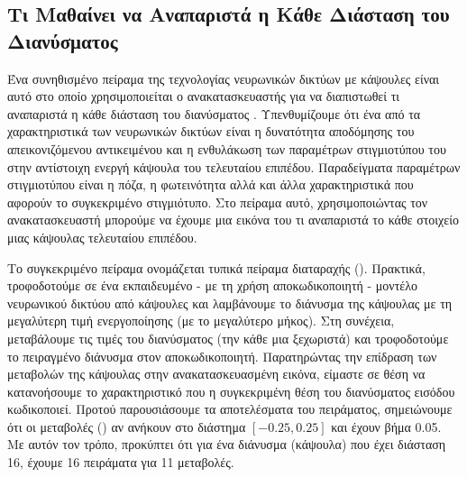 \subsection{Τι Μαθαίνει να Αναπαριστά η Κάθε Διάσταση του Διανύσματος }
Ένα συνηθισμένο πείραμα της τεχνολογίας νευρωνικών δικτύων με κάψουλες είναι αυτό στο οποίο χρησιμοποιείται ο ανακατασκευαστής για να διαπιστωθεί τι αναπαριστά η κάθε διάσταση του διανύσματος . Υπενθυμίζουμε ότι ένα από τα χαρακτηριστικά των νευρωνικών δικτύων είναι η δυνατότητα αποδόμησης του απεικονιζόμενου αντικειμένου και η ενθυλάκωση των παραμέτρων στιγμιοτύπου του στην αντίστοιχη ενεργή κάψουλα του τελευταίου επιπέδου. Παραδείγματα παραμέτρων στιγμιοτύπου είναι η πόζα, η φωτεινότητα αλλά και άλλα χαρακτηριστικά που αφορούν το συγκεκριμένο στιγμιότυπο. Στο πείραμα αυτό, χρησιμοποιώντας τον ανακατασκευαστή μπορούμε να έχουμε μια εικόνα του τι αναπαριστά το κάθε στοιχείο μιας κάψουλας τελευταίου επιπέδου.\par

Το συγκεκριμένο πείραμα ονομάζεται τυπικά πείραμα διαταραχής (). Πρακτικά, τροφοδοτούμε σε ένα εκπαιδευμένο - με τη χρήση αποκωδικοποιητή - μοντέλο νευρωνικού δικτύου από κάψουλες και λαμβάνουμε το διάνυσμα της κάψουλας  με τη μεγαλύτερη τιμή ενεργοποίησης (με το μεγαλύτερο μήκος). Στη συνέχεια, μεταβάλουμε τις τιμές του διανύσματος (την κάθε μια ξεχωριστά) και τροφοδοτούμε το πειραγμένο διάνυσμα στον αποκωδικοποιητή. Παρατηρώντας την επίδραση των μεταβολών της κάψουλας στην ανακατασκευασμένη εικόνα, είμαστε σε θέση να  κατανοήσουμε το χαρακτηριστικό που η συγκεκριμένη θέση του διανύσματος εισόδου κωδικοποιεί. Προτού παρουσιάσουμε τα αποτελέσματα του πειράματος, σημειώνουμε ότι οι μεταβολές () αν ανήκουν στο διάστημα $[-0.25, 0.25]$ και έχουν βήμα 0.05. Με αυτόν τον τρόπο, προκύπτει ότι για ένα διάνυσμα (κάψουλα) που έχει διάσταση 16, έχουμε 16 πειράματα για 11 μεταβολές.\par

